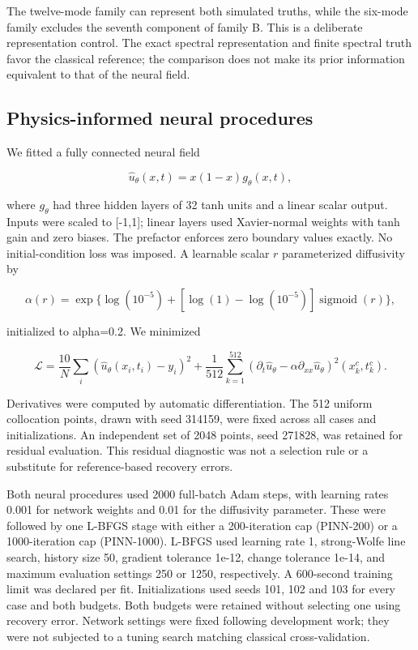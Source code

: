 \documentclass[10pt,a4paper]{article}
\begin{document}
The twelve-mode family can represent both simulated truths, while the six-mode
family excludes the seventh component of family B. This is a deliberate
representation control. The exact spectral representation and finite spectral
truth favor the classical reference; the comparison does not make its prior
information equivalent to that of the neural field.

\subsection{Physics-informed neural procedures}

We fitted a fully connected neural field

\begin{equation}
\widehat u_\theta(x,t)=x(1-x)g_\theta(x,t),
\end{equation}

where \(g_\theta\) had three hidden layers of 32 tanh units and a linear scalar
output. Inputs were scaled to [-1,1]; linear layers used Xavier-normal weights
with tanh gain and zero biases. The prefactor enforces zero boundary values
exactly. No initial-condition loss was imposed. A learnable scalar \(r\)
parameterized diffusivity by

\begin{equation}
\alpha(r)=\exp\{\log(10^{-5})+
 [\log(1)-\log(10^{-5})]\operatorname{sigmoid}(r)\},
\end{equation}

initialized to alpha=0.2. We minimized

\begin{equation}
\mathcal L=\frac{10}{N}\sum_i(\widehat u_\theta(x_i,t_i)-y_i)^2
 +\frac{1}{512}\sum_{k=1}^{512}
 (\partial_t\widehat u_\theta-\alpha\partial_{xx}\widehat u_\theta)^2(x_k^c,t_k^c).
\end{equation}

Derivatives were computed by automatic differentiation. The 512 uniform
collocation points, drawn with seed 314159, were fixed across all cases and
initializations. An independent set of 2048 points, seed 271828, was retained
for residual evaluation. This residual diagnostic was not a selection rule or
a substitute for reference-based recovery errors.

Both neural procedures used 2000 full-batch Adam steps, with learning rates
0.001 for network weights and 0.01 for the diffusivity parameter. These were
followed by one L-BFGS stage with either a 200-iteration cap (PINN-200) or a
1000-iteration cap (PINN-1000). L-BFGS used learning rate 1, strong-Wolfe line
search, history size 50, gradient tolerance 1e-12, change tolerance 1e-14, and
maximum evaluation settings 250 or 1250, respectively. A 600-second training
limit was declared per fit. Initializations used seeds 101, 102 and 103 for
every case and both budgets. Both budgets were retained without selecting one
using recovery error. Network settings were fixed following development work;
they were not subjected to a tuning search matching classical cross-validation.
\end{document}
